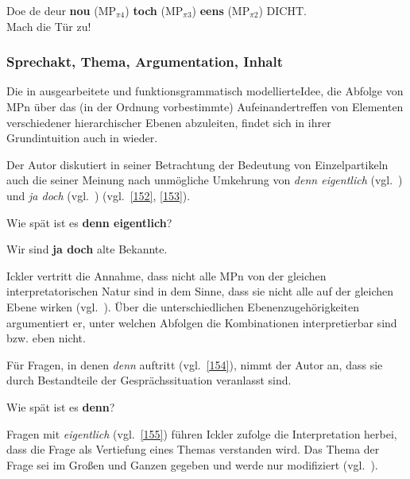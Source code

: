 \begin{exe}
	\ex\label{151} 
	Doe de deur \textbf{nou} ($\textrm{MP}_{\pi\textrm{4}}$) \textbf{toch} ($\textrm{MP}_{\pi\textrm{3}}$) \textbf{eens} ($\textrm{MP}_{\pi\textrm{2}}$) DICHT.\\
	Mach die Tür zu!
	\hbox{}\hfill\hbox{\citet[163]{Vismans1994}}	
\end{exe}

\subsubsection{Sprechakt, Thema, Argumentation, Inhalt}
\label{sec:stai}
Die in \citet{Vismans1994} ausgearbeitete und funktionsgrammatisch modellierte\linebreak Idee, die Abfolge von MPn über das (in der Ordnung vorbestimmte) Aufeinandertreffen von Elementen verschiedener hierarchischer Ebenen abzuleiten, findet sich in ihrer Grundintuition auch in \citet{Ickler1994} wieder. 

Der Autor diskutiert in seiner Betrachtung der Bedeutung von Einzelpartikeln auch die seiner Meinung nach unmögliche Umkehrung von \textit{denn eigentlich} (vgl.\ \citealt[384]{Ickler1994}) und \textit{ja doch} (vgl.\ \citealt[404]{Ickler1994}) (vgl.\ \ref{152}, \ref{153}). 

\begin{exe}
	\ex\label{152} 
	Wie spät ist es \textbf{denn eigentlich}?
\end{exe}
	
\begin{exe}
	\ex\label{153} 
	Wir sind \textbf{ja doch} alte Bekannte.
\end{exe}		
Ickler vertritt die Annahme, dass nicht alle MPn von der gleichen interpretatorischen Natur sind in dem Sinne, dass sie nicht alle auf der gleichen Ebene wirken (vgl.\ \citealt[379]{Ickler1994}). Über die unterschiedlichen Ebenenzugehörigkeiten argumentiert er, unter welchen Abfolgen die Kombinationen interpretierbar sind bzw. eben nicht.

Für Fragen, in denen \textit{denn} auftritt (vgl.\ \ref{154}), nimmt der Autor an, dass sie durch Bestandteile der Gesprächssituation veranlasst sind. 
	
\begin{exe}
	\ex\label{154} 
	Wie spät ist es \textbf{denn}?
\end{exe}	
Fragen mit \textit{eigentlich} (vgl.\ \ref{155}) führen Ickler zufolge die Interpretation herbei, dass die Frage als Vertiefung eines Themas verstanden wird. Das Thema der Frage sei im Großen und Ganzen gegeben und werde nur modifiziert (vgl.\ \citealt[384]{Ickler1994}).

